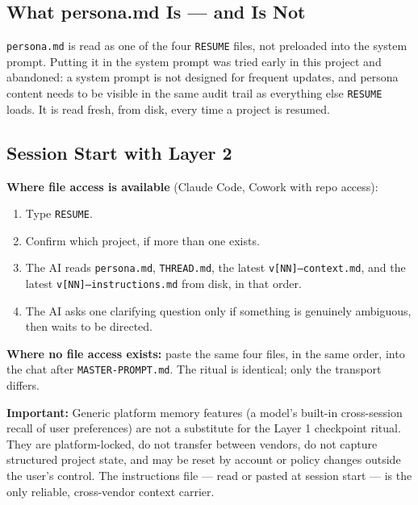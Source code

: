 \documentclass[12pt,letterpaper]{article}
\begin{document}
\subsection{What persona.md Is --- and Is Not}

\texttt{persona.md} is read as one of the four \texttt{RESUME} files,
not preloaded into the system prompt. Putting it in the system prompt
was tried early in this project and abandoned: a system prompt is not
designed for frequent updates, and persona content needs to be visible
in the same audit trail as everything else \texttt{RESUME} loads. It is
read fresh, from disk, every time a project is resumed.

\subsection{Session Start with Layer 2}

\textbf{Where file access is available} (Claude Code, Cowork with repo
access):

\begin{enumerate}
  \item Type \texttt{RESUME}.
  \item Confirm which project, if more than one exists.
  \item The AI reads \texttt{persona.md}, \texttt{THREAD.md}, the
        latest \texttt{v[NN]--context.md}, and the latest
        \texttt{v[NN]--instructions.md} from disk, in that order.
  \item The AI asks one clarifying question only if something is
        genuinely ambiguous, then waits to be directed.
\end{enumerate}

\textbf{Where no file access exists:} paste the same four files, in
the same order, into the chat after \texttt{MASTER-PROMPT.md}. The
ritual is identical; only the transport differs.

\begin{mdframed}[style=warnbox]
\textbf{Important:} Generic platform memory features (a model's
built-in cross-session recall of user preferences) are not a substitute
for the Layer 1 checkpoint ritual. They are platform-locked, do not
transfer between vendors, do not capture structured project state, and
may be reset by account or policy changes outside the user's control.
The instructions file --- read or pasted at session start --- is the
only reliable, cross-vendor context carrier.
\end{mdframed}
\end{document}
